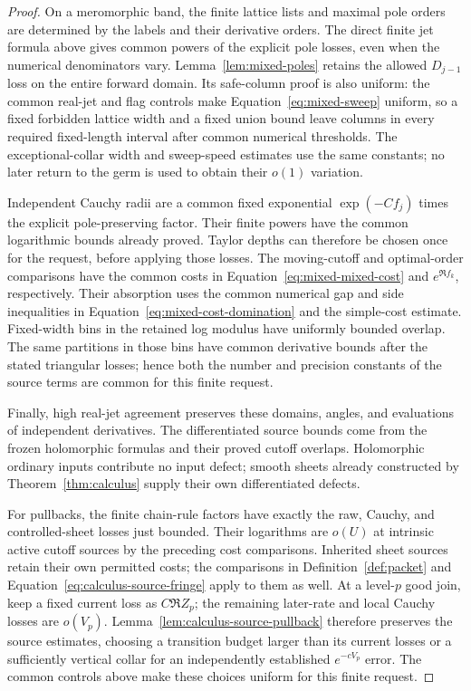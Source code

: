 \begin{proof}
On a meromorphic band, the finite lattice lists and maximal pole
orders are determined by the labels and their derivative orders.
The direct finite jet formula above gives common powers of the
explicit pole losses, even when the numerical denominators vary.
Lemma~\ref{lem:mixed-poles} retains the allowed $D_{j-1}$ loss on
the entire forward domain. Its safe-column proof is also uniform:
the common real-jet and flag controls make
Equation~\eqref{eq:mixed-sweep} uniform, so a fixed forbidden
lattice width and a fixed union bound leave columns in every
required fixed-length interval after common numerical thresholds.
The exceptional-collar width and sweep-speed estimates use the
same constants; no later return to the germ is used to obtain
their $o(1)$ variation.

Independent Cauchy radii are a common fixed exponential
$\exp(-C f_j)$ times the explicit pole-preserving factor. Their
finite powers have the common logarithmic bounds already proved.
Taylor depths can therefore be chosen once for the request,
before applying those losses. The moving-cutoff and optimal-order
comparisons have the common costs in
Equation~\eqref{eq:mixed-mixed-cost} and $e^{\Re f_k}$,
respectively. Their absorption uses the common numerical gap
and side inequalities in Equation~\eqref{eq:mixed-cost-domination}
and the simple-cost estimate. Fixed-width bins in the retained
log modulus have uniformly bounded overlap. The same partitions
in those bins have common derivative bounds after the stated
triangular losses; hence both the number and precision constants
of the source terms are common for this finite request.

Finally, high real-jet agreement preserves these domains, angles,
and evaluations of independent derivatives. The differentiated source
bounds come from the frozen holomorphic formulas and their proved
cutoff overlaps. Holomorphic ordinary inputs contribute no input defect;
smooth sheets already constructed by Theorem~\ref{thm:calculus}
supply their own differentiated defects.

For pullbacks, the finite chain-rule factors have exactly the raw,
Cauchy, and controlled-sheet losses just bounded. Their logarithms are
$o(U)$ at intrinsic active cutoff sources by the preceding cost
comparisons. Inherited sheet sources retain their own permitted costs;
the comparisons in Definition~\ref{def:packet} and
Equation~\eqref{eq:calculus-source-fringe} apply to them as well.
At a level-$p$ good join, keep a fixed
current loss as $C\Re Z_p$; the remaining later-rate and local Cauchy
losses are $o(V_p)$. Lemma~\ref{lem:calculus-source-pullback} therefore
preserves the source estimates, choosing a transition budget larger
than its current losses or a sufficiently vertical collar for an
independently established $e^{-cV_p}$ error. The common controls above
make these choices uniform for this finite request.


\end{proof}

